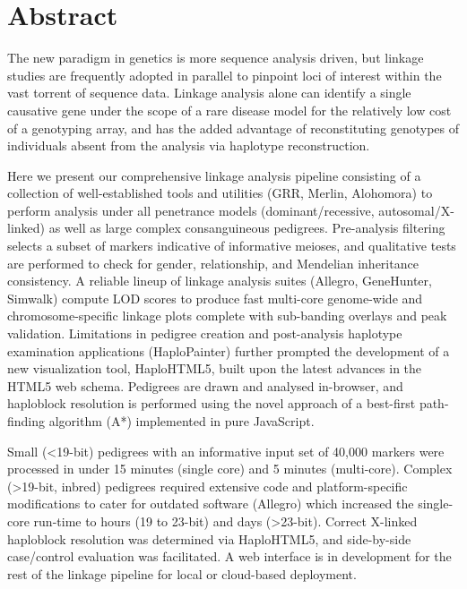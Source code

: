 \chapter*{Abstract}

\begin{spacing}{1.4}
The new paradigm in genetics is more sequence analysis driven, but linkage studies are frequently adopted in parallel to pinpoint loci of interest within the vast torrent of sequence data. Linkage analysis alone can identify a single causative gene under the scope of a rare disease model for the relatively low cost of a genotyping array, and has the added advantage of reconstituting genotypes of individuals absent from the analysis via haplotype reconstruction.

Here we present our comprehensive linkage analysis pipeline consisting of a collection of well-established tools and utilities (GRR, Merlin, Alohomora) to perform analysis under all penetrance models (dominant/recessive, autosomal/X-linked) as well as large complex consanguineous pedigrees. Pre-analysis filtering selects a subset of markers indicative of informative meioses, and qualitative tests are performed to check for gender, relationship, and Mendelian inheritance consistency. A reliable lineup of linkage analysis suites (Allegro, GeneHunter, Simwalk) compute LOD scores to produce fast multi-core genome-wide and chromosome-specific linkage plots complete with sub-banding overlays and peak validation. Limitations in pedigree creation and post-analysis haplotype examination applications (HaploPainter) further prompted the development of a new  visualization tool,  HaploHTML5,  built upon the latest advances in the HTML5 web schema. Pedigrees are drawn and analysed in-browser, and haploblock resolution is performed using the novel approach of a best-first path-finding algorithm (A*) implemented in pure JavaScript.

Small (<19-bit) pedigrees with an informative input set of 40,000 markers were processed in under 15 minutes (single core) and 5 minutes (multi-core). Complex (>19-bit, inbred) pedigrees required extensive code and platform-specific modifications to cater for outdated software (Allegro) which increased the single-core run-time to hours (19 to 23-bit) and days (>23-bit). Correct X-linked haploblock resolution was determined via HaploHTML5, and side-by-side case/control evaluation was facilitated.  A web interface is in development for the rest of the linkage pipeline for local or cloud-based deployment.
\end{spacing}